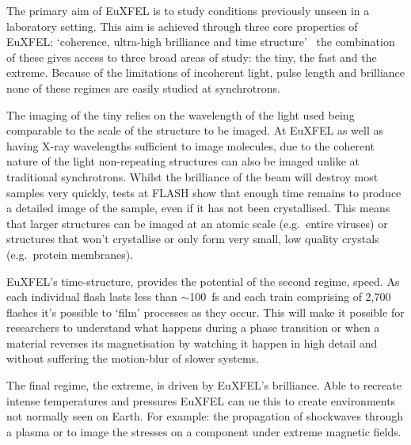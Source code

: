 The primary aim of EuXFEL is to study conditions previously unseen in a laboratory setting. This aim is achieved through three core properties of EuXFEL: `coherence, ultra-high brilliance and time structure'~\cite{xfel_tdr} the combination of these gives access to three broad areas of study: the tiny, the fast and the extreme. Because of the limitations of incoherent light, pulse length and brilliance none of these regimes are easily studied at synchrotrons.

The imaging of the tiny relies on the wavelength of the light used being comparable to the scale of the structure to be imaged. At EuXFEL as well as having X-ray wavelengths sufficient to image molecules, due to the coherent nature of the light non-repeating structures can also be imaged unlike at traditional synchrotrons. Whilst the brilliance of the beam will destroy most samples very quickly, tests at FLASH show that enough time remains to produce a detailed image of the sample, even if it has not been crystallised. This means that larger structures can be imaged at an atomic scale (e.g.\ entire viruses) or structures that won't crystallise or only form very small, low quality crystals (e.g.\ protein membranes).

EuXFEL's time-structure, provides the potential of the second regime, speed. As each individual flash lasts less than \( \sim \)100~fs and each train comprising of 2,700 flashes it's possible to `film' processes as they occur. This will make it possible for researchers to understand what happens during a phase transition or when a material reverses its magnetisation by watching it happen in high detail and without suffering the motion-blur of slower systems.

The final regime, the extreme, is driven by EuXFEL's brilliance. Able to recreate intense temperatures and pressures EuXFEL can ue this to create environments not normally seen on Earth. For example: the propagation of shockwaves through a plasma or to image the stresses on a component under extreme magnetic fields.
